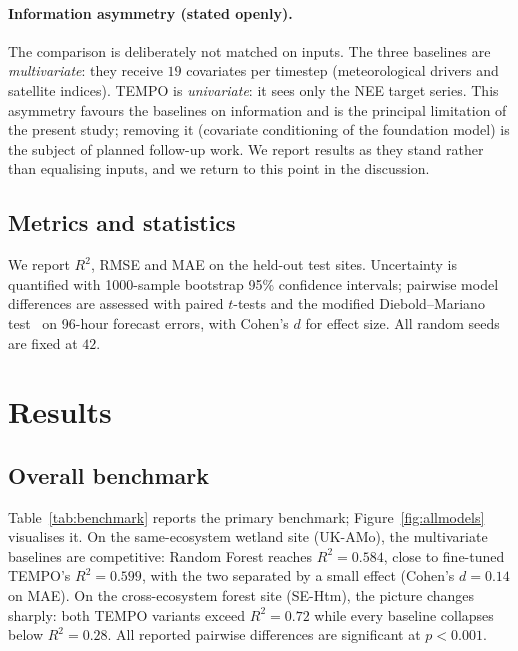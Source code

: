 \documentclass[sigconf]{acmart}          %
\begin{document}
\paragraph{Information asymmetry (stated openly).}
The comparison is deliberately not matched on inputs. The three baselines are
\emph{multivariate}: they receive $19$ covariates per timestep (meteorological
drivers and satellite indices). TEMPO is \emph{univariate}: it sees only the
NEE target series. This asymmetry favours the baselines on information and is
the principal limitation of the present study; removing it (covariate
conditioning of the foundation model) is the subject of planned follow-up
work. We report results as they stand rather than equalising inputs, and we
return to this point in the discussion.

\subsection{Metrics and statistics}
We report $R^2$, RMSE and MAE on the held-out test sites. Uncertainty is
quantified with 1000-sample bootstrap 95\% confidence intervals; pairwise
model differences are assessed with paired $t$-tests and the modified
Diebold--Mariano test~\cite{harvey1997testing} on 96-hour forecast errors, with
Cohen's $d$ for effect size. All random seeds are fixed at $42$.

\section{Results}

\subsection{Overall benchmark}
\label{sec:benchmark}
Table~\ref{tab:benchmark} reports the primary benchmark; Figure~\ref{fig:allmodels}
visualises it. On the same-ecosystem wetland site (UK-AMo), the multivariate
baselines are competitive: Random Forest reaches $R^2=0.584$, close to
fine-tuned TEMPO's $R^2=0.599$, with the two separated by a small effect
(Cohen's $d=0.14$ on MAE). On the cross-ecosystem forest site (SE-Htm), the
picture changes sharply: both TEMPO variants exceed $R^2=0.72$ while every
baseline collapses below $R^2=0.28$. All reported pairwise differences are
significant at $p<0.001$.
\end{document}
